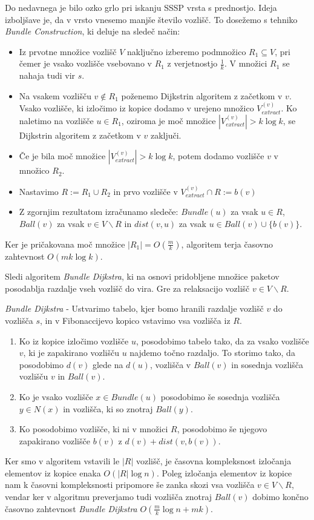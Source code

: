 \documentclass{article}
\begin{document}
Do nedavnega je bilo ozko grlo pri iskanju SSSP vrsta s prednostjo. Ideja izboljšave je, da v vrsto vnesemo manjše število vozlišč. To dosežemo s tehniko \textit{Bundle Construction}, ki deluje na sledeč način:
\begin{itemize}
  \item Iz prvotne množice vozlišč $V$ naključno izberemo podmnožico $R_1 \subseteq V$, pri čemer je vsako vozlišče vsebovano v $R_1$ z verjetnostjo $\frac{1}{k}$. V množici $R_1$ se nahaja tudi vir $s$.
  \item Na vsakem vozlišču $v \notin R_1$ poženemo Dijkstrin algoritem z začetkom v $v$.
  Vsako vozlišče, ki izločimo iz kopice dodamo v urejeno množico $V_{extract}^{(v)}$. Ko naletimo na vozlišče $u \in R_1$, oziroma je moč množice $|V_{extract}^{(v)}| > k \log k$, se Dijkstrin algoritem z začetkom v $v$ zaključi.
  \item Če je bila moč množice $|V_{extract}^{(v)}| > k \log k$, potem dodamo vozlišče $v$ v množico $R_2$.
  \item Nastavimo $R := R_1 \cup R_2$ in prvo vozlišče v $V_{extract}^{(v)} \cap R := b(v)$ 
  \item Z zgornjim rezultatom izračunamo sledeče: $Bundle(u)$ za vsak $u \in R$, $Ball(v)$ za vsak $v \in V \backslash R$ in $dist(v,u)$ za vsak $u \in Ball(v) \cup \{b(v)\}$.
\end{itemize}

Ker je pričakovana moč množice $|R_1| = O(\frac{m}{k})$, algoritem terja časovno zahtevnost $O(mk \log k)$.

Sledi algoritem \textit{Bundle Dijkstra}, ki na osnovi pridobljene množice paketov posodablja razdalje vseh vozlišč do vira. Gre za relaksacijo vozlišč $v \in V \backslash R$.

\textit{Bundle Dijkstra} - Ustvarimo tabelo, kjer bomo hranili razdalje vozlišč $v$ do vozlišča $s$, in v Fibonaccijevo kopico vstavimo vsa vozlišča iz $R$.
\begin{enumerate}
  \item
  Ko iz kopice izločimo vozlišče $u$, posodobimo tabelo tako, da za vsako vozlišče $v$, ki je zapakirano vozlišču $u$ najdemo točno razdaljo. To storimo tako, da posodobimo $d(v)$ glede na $d(u)$, vozlišča v $Ball(v)$ in sosednja vozlišča vozlišču $v$ in $Ball(v)$.
  \item
  Ko je vsako vozlišče $x \in Bundle(u)$ posodobimo še sosednja vozlišča $y \in N(x)$ in vozlišča, ki so znotraj $Ball(y)$.
  \item
  Ko posodobimo vozlišče, ki ni v množici $R$, posodobimo še njegovo zapakirano vozlišče $b(v)$ z $d(v) + dist(v,b(v))$.
\end{enumerate}
Ker smo v algoritem vstavili le $|R|$ vozlišč, je časovna kompleksnost izločanja elementov iz kopice enaka $O(|R|\log n)$. Poleg izločanja elementov iz kopice nam k časovni kompleksnosti pripomore še zanka skozi vsa vozlišča ${v} \in V \backslash R$, vendar ker v algoritmu preverjamo tudi vozlišča znotraj $Ball(v)$ dobimo končno časovno zahtevnost \textit{Bundle Dijkstra} $O(\frac{m}{k}\log n + mk)$.
\end{document}
